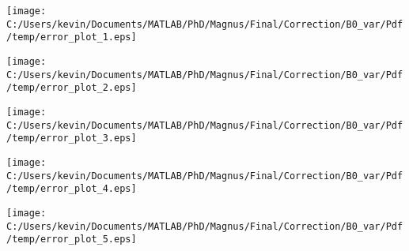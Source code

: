 \begin{landscape}
\texttt{[image: C:/Users/kevin/Documents/MATLAB/PhD/Magnus/Final/Correction/B0\_var/Pdf/temp/error\_plot\_1.eps]}
\end{landscape}
\begin{landscape}
\texttt{[image: C:/Users/kevin/Documents/MATLAB/PhD/Magnus/Final/Correction/B0\_var/Pdf/temp/error\_plot\_2.eps]}
\end{landscape}
\begin{landscape}
\texttt{[image: C:/Users/kevin/Documents/MATLAB/PhD/Magnus/Final/Correction/B0\_var/Pdf/temp/error\_plot\_3.eps]}
\end{landscape}
\begin{landscape}
\texttt{[image: C:/Users/kevin/Documents/MATLAB/PhD/Magnus/Final/Correction/B0\_var/Pdf/temp/error\_plot\_4.eps]}
\end{landscape}
\begin{landscape}
\texttt{[image: C:/Users/kevin/Documents/MATLAB/PhD/Magnus/Final/Correction/B0\_var/Pdf/temp/error\_plot\_5.eps]}
\end{landscape}

